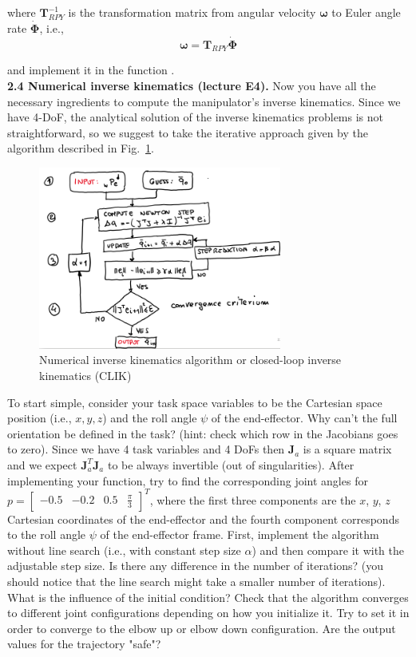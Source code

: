 \documentclass[11pt]{article}
\newcommand{\mat}[1]{\ensuremath{\begin{bmatrix}#1\end{bmatrix}}}	%
\begin{document}
where $\mathbf{T}_{RPY}^{-1}$ is the transformation matrix from angular velocity $\boldsymbol{\omega}$ to Euler angle rate $\dot{\mathbf{\Phi}}$, i.e.,
\begin{equation*}
	\boldsymbol{\omega} = \mathbf{T}_{RPY} \dot{\mathbf{\Phi}}
\end{equation*}

and implement it in the function .\\




\textbf{2.4 Numerical inverse kinematics (lecture E4).} Now you have all the necessary ingredients to compute the manipulator's inverse kinematics. Since we have 4-DoF, the analytical solution of the inverse kinematics problems is not straightforward, so we suggest to take the iterative approach given by the algorithm described in Fig.~\ref{fig:CLIK}.  
%
\begin{figure}[bht]
	\centering
	\includegraphics[width=8cm]{pics/flow_chart.png}
	\caption{Numerical inverse kinematics algorithm or closed-loop inverse kinematics (CLIK)}
	\label{fig:CLIK}
\end{figure}
%
To start simple, consider your task space variables to be the Cartesian space position (i.e., $x,y,z$) and the roll angle $\psi$ of the end-effector. 
Why can't the full orientation be defined in the task? (hint: check which row in the Jacobians goes to zero).
Since we have 4 task variables and 4 DoFs then   $\mathbf{J}_a$ is a square matrix and we expect $\mathbf{J}_a^T\mathbf{J}_a$ to be always invertible (out of singularities).  After implementing your function, try to find the corresponding joint angles for $p = \mat{-0.5 & -0.2 & 0.5 & \frac{\pi}{3}}^T$, where the first three components are the $x$, $y$, $z$ Cartesian coordinates of the end-effector and the fourth component corresponds to the roll angle $\psi$ of the end-effector frame.
First, implement the algorithm without line search (i.e., with constant step size $\alpha$) and then compare it with the adjustable step size. Is there any difference in the number of iterations?  (you should notice that the line search might take a smaller number of iterations). What is the influence of the initial condition? 
Check that the algorithm converges to different joint configurations depending on how you initialize it. Try to set it in order to converge to the elbow up or elbow down configuration.  Are the output values for the trajectory "safe"? 
\end{document}
